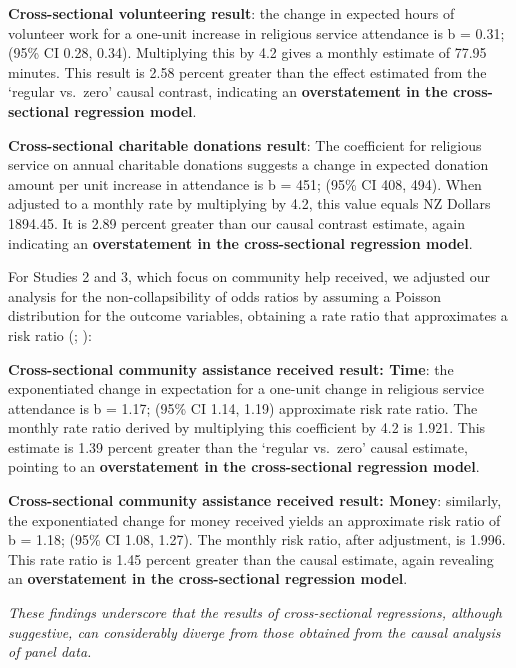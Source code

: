 \documentclass[
  single column]{article}
\begin{document}
\textbf{Cross-sectional volunteering result}: the change in expected
hours of volunteer work for a one-unit increase in religious service
attendance is b = 0.31; (95\% CI 0.28, 0.34). Multiplying this by 4.2
gives a monthly estimate of 77.95 minutes. This result is 2.58 percent
greater than the effect estimated from the `regular vs.~zero' causal
contrast, indicating an \textbf{overstatement in the cross-sectional
regression model}.

\textbf{Cross-sectional charitable donations result}: The coefficient
for religious service on annual charitable donations suggests a change
in expected donation amount per unit increase in attendance is b = 451;
(95\% CI 408, 494). When adjusted to a monthly rate by multiplying by
4.2, this value equals NZ Dollars 1894.45. It is 2.89 percent greater
than our causal contrast estimate, again indicating an
\textbf{overstatement in the cross-sectional regression model}.

For Studies 2 and 3, which focus on community help received, we adjusted
our analysis for the non-collapsibility of odds ratios by assuming a
Poisson distribution for the outcome variables, obtaining a rate ratio
that approximates a risk ratio
(; ):

\textbf{Cross-sectional community assistance received result: Time}: the
exponentiated change in expectation for a one-unit change in religious
service attendance is b = 1.17; (95\% CI 1.14, 1.19) approximate risk
rate ratio. The monthly rate ratio derived by multiplying this
coefficient by 4.2 is 1.921. This estimate is 1.39 percent greater than
the `regular vs.~zero' causal estimate, pointing to an
\textbf{overstatement in the cross-sectional regression model}.

\textbf{Cross-sectional community assistance received result: Money}:
similarly, the exponentiated change for money received yields an
approximate risk ratio of b = 1.18; (95\% CI 1.08, 1.27). The monthly
risk ratio, after adjustment, is 1.996. This rate ratio is 1.45 percent
greater than the causal estimate, again revealing an
\textbf{overstatement in the cross-sectional regression model}.

\emph{These findings underscore that the results of cross-sectional
regressions, although suggestive, can considerably diverge from those
obtained from the causal analysis of panel data.}

\newpage{}
\end{document}
